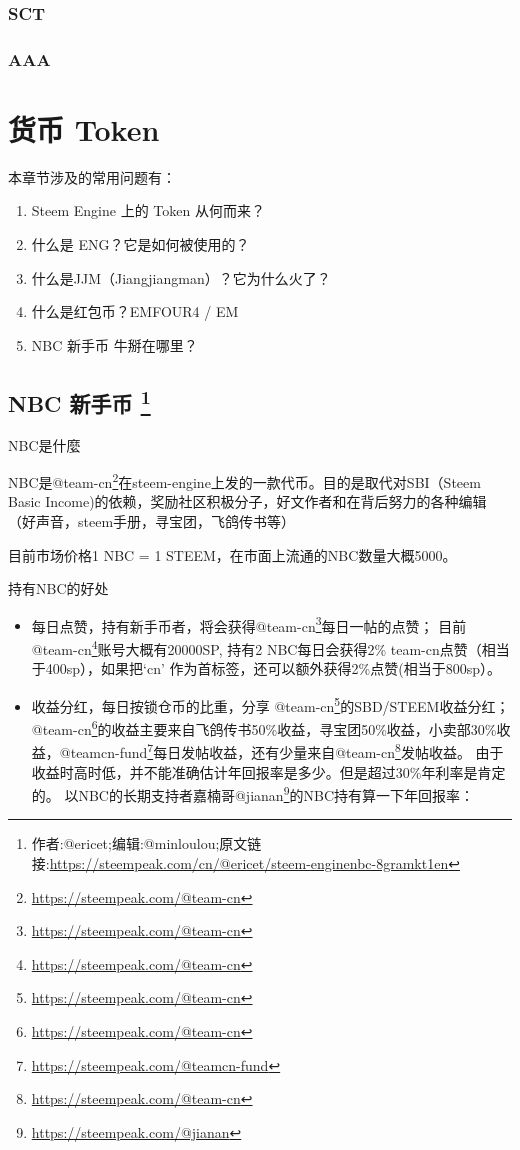 \documentclass[]{ctexbook}
\providecommand{\tightlist}{%
  \setlength{\itemsep}{0pt}\setlength{\parskip}{0pt}}
\renewcommand{\href}[2]{#2\footnote{\url{#1}}}
\begin{document}
\hypertarget{sct}{%
\subsection{SCT}\label{sct}}

\hypertarget{aaa}{%
\subsection{AAA}\label{aaa}}

\hypertarget{token}{%
\chapter{货币 Token}\label{token}}

本章节涉及的常用问题有：

\begin{enumerate}
\def\labelenumi{\arabic{enumi}.}
\tightlist
\item
  Steem Engine 上的 Token 从何而来？
\item
  什么是 ENG？它是如何被使用的？
\item
  什么是JJM（Jiangjiangman）？它为什么火了？
\item
  什么是红包币？EMFOUR4 / EM
\item
  NBC 新手币 牛掰在哪里？
\end{enumerate}

\hypertarget{nbc-}{%
\section[NBC 新手币 ]{\texorpdfstring{NBC 新手币 \footnote{作者:@ericet;编辑:@minloulou;原文链接:\url{https://steempeak.com/cn/@ericet/steem-enginenbc-8gramkt1en}}}{NBC 新手币 }}\label{nbc-}}

NBC是什麼

NBC是\href{https://steempeak.com/@team-cn}{@team-cn}在steem-engine上发的一款代币。目的是取代对SBI（Steem Basic Income)的依赖，奖励社区积极分子，好文作者和在背后努力的各种编辑（好声音，steem手册，寻宝团，飞鸽传书等）

目前市场价格1 NBC = 1 STEEM，在市面上流通的NBC数量大概5000。

持有NBC的好处

\begin{itemize}
\item
  每日点赞，持有新手币者，将会获得\href{https://steempeak.com/@team-cn}{@team-cn}每日一帖的点赞； 目前\href{https://steempeak.com/@team-cn}{@team-cn}账号大概有20000SP, 持有2 NBC每日会获得2\% team-cn点赞（相当于400sp），如果把`cn' 作为首标签，还可以额外获得2\%点赞(相当于800sp）。
\item
  收益分红，每日按锁仓币的比重，分享 \href{https://steempeak.com/@team-cn}{@team-cn}的SBD/STEEM收益分红； \href{https://steempeak.com/@team-cn}{@team-cn}的收益主要来自飞鸽传书50\%收益，寻宝团50\%收益，小卖部30\%收益，\href{https://steempeak.com/@teamcn-fund}{@teamcn-fund}每日发帖收益，还有少量来自\href{https://steempeak.com/@team-cn}{@team-cn}发帖收益。 由于收益时高时低，并不能准确估计年回报率是多少。但是超过30\%年利率是肯定的。 以NBC的长期支持者嘉楠哥\href{https://steempeak.com/@jianan}{@jianan}的NBC持有算一下年回报率：
\end{itemize}
\end{document}
